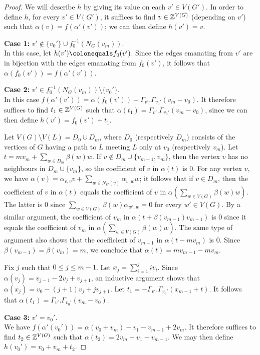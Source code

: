 \begin{proof}
We will describe $h$ by giving its value on each $v' \in V(G')$. In order to define $h$, for every $v' \in V(G')$, it suffices to find $v \in \mathbb Z^{V(G)}$ (depending on $v'$) such that $\alpha (v) = f(\alpha'(v'))$; we can then define $h(v') = v$. 

{\bf{Case 1:}} $v' \notin \{v_0'\} \cup f_0^{-1}(N_G(v_m))$. \\
In this case, let $h(v') \colonequals f_0(v')$. Since the edges emanating from $v'$ are in bijection with the edges emanating from $f_0(v')$, it follows that $\alpha (f_0(v')) = f(\alpha' (v'))$. 

{\bf{Case 2:}} $v' \in f_0^{-1}(N_G(v_m)) \setminus \{v_0'\}$. \\
In this case $f(\alpha'(v')) = \alpha(f_0(v'))+\Gamma_{v'}.\Gamma_{v_0'}(v_m-v_0)$. It therefore suffices to find $t_1 \in \mathbb Z^{V(G)}$ such that $\alpha(t_1) = \Gamma_{v'}.\Gamma_{v_0'}(v_m-v_0)$, since we can then define $h(v') = f_0(v')+t_1$. 

Let $V(G) \setminus V(L) = D_0 \cup D_m$, where $D_0$ (respectively $D_m$) consists of the vertices of $G$ having a path to $L$ meeting $L$ only at $v_0$ (respectively $v_m$). Let $t = mv_m+\sum_{w \in D_m} \beta(w) w$. If $v \notin D_m \cup \{v_{m-1},v_m\}$, then the vertex $v$ has no neighbours in $D_m \cup \{v_m\}$, so the coefficient of $v$ in $\alpha(t)$ is $0$. For any vertex $v$, we have $\alpha(v) = \alpha_{v,v} v + \sum_{w \in N_G(v)} \alpha_{v,w} w$; it follows that if $v \in D_m$, then the coefficient of $v$ in $\alpha(t)$ equals the coefficient of $v$ in $\alpha(\sum_{w \in V(G)} \beta(w) w)$. The latter is $0$ since $\sum_{w \in V(G)} \beta(w) \alpha_{w',w} = 0$ for every $w' \in V(G)$.  By a similar argument, the coefficient of $v_m$ in $\alpha(t+\beta(v_{m-1})v_{m-1})$ is $0$ since it equals the coefficient of $v_m$ in $\alpha(\sum_{w \in V(G)} \beta(w) w)$. The same type of argument also shows that the coefficient of $v_{m-1}$ in $\alpha(t-mv_m)$ is $0$. Since $\beta(v_{m-1}) = \beta(v_m) = m$, we conclude that $\alpha(t) = mv_{m-1}-mv_m$. 

Fix $j$ such that $0 \leq j \leq m-1$. Let $x_j = \sum_{i=1}^j iv_i$. Since $\alpha(v_j) = v_{j-1}-2v_j+v_{j+1}$, an inductive argument shows that $\alpha(x_j) = v_0-(j+1)v_j+jv_{j+1}$. Let $t_1 = -\Gamma_{v'}.\Gamma_{v_0'}(x_{m-1}+t)$. It follows that $\alpha(t_1) = \Gamma_{v'}.\Gamma_{v_0'}(v_m-v_0)$.

{\bf{Case 3:}} $v' = v_0'$. \\
We have $f(\alpha'(v_0')) = \alpha(v_0+v_m)-v_1-v_{m-1}+2v_m$. It therefore suffices to find $t_2 \in \mathbb Z^{V(G)}$ such that $\alpha(t_2) = 2v_m-v_1-v_{m-1}$. We may then define $h(v_0') = v_0+v_m+t_2$. 
 

\end{proof}
